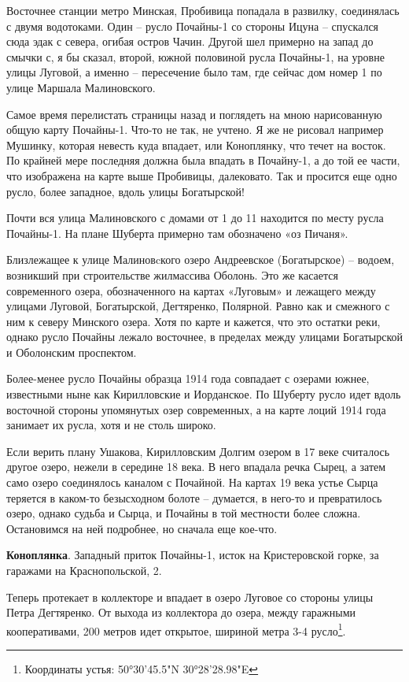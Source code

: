 Восточнее станции метро Минская, Пробивица попадала в развилку, соединялась с двумя водотоками. Один – русло Почайны-1 со стороны Ицуна – спускался сюда эдак с севера, огибая остров Чачин. Другой шел примерно на запад до смычки с, я бы сказал, второй, южной половиной русла Почайны-1, на уровне улицы Луговой, а именно – пересечение было там, где сейчас дом номер 1 по улице Маршала Малиновского.

Самое время перелистать страницы назад и поглядеть на мною нарисованную общую карту Почайны-1. Что-то не так, не учтено. Я же не рисовал например Мушинку, которая невесть куда впадает, или Коноплянку, что течет на восток. По крайней мере последняя должна была впадать в Почайну-1, а до той ее части, что изображена на карте выше Пробивицы, далековато. Так и просится еще одно русло, более западное, вдоль улицы Богатырской!

Почти вся улица Малиновского с домами от 1 до 11 находится по месту русла Почайны-1. На плане Шуберта примерно там обозначено «оз Пичаня».

Близлежащее к улице Малиновcкого озеро Андреевское (Богатырское) – водоем, возникший при строительстве жилмассива Оболонь. Это же касается современного озера, обозначенного на картах «Луговым» и лежащего между улицами Луговой, Богатырской, Дегтяренко, Полярной. Равно как и смежного с ним к северу Минского озера. Хотя по карте и кажется, что это остатки реки, однако русло Почайны лежало восточнее, в пределах между улицами Богатырской и Оболонским проспектом.

Более-менее русло Почайны образца 1914 года совпадает с озерами южнее, известными ныне как Кирилловские и Иорданское. По Шуберту русло идет вдоль восточной стороны упомянутых озер современных, а на карте лоций 1914 года занимает их русла, хотя и не столь широко.

Если верить плану Ушакова, Кирилловским Долгим озером в 17 веке считалось другое озеро, нежели в середине 18 века. В него впадала речка Сырец, а затем само озеро соединялось каналом с Почайной. На картах 19 века устье Сырца теряется в каком-то безысходном болоте – думается, в него-то и превратилось озеро, однако судьба и Сырца, и Почайны в той местности более сложна. Остановимся на ней подробнее, но сначала еще кое-что.

\textbf{Коноплянка}. Западный приток Почайны-1, исток на Кристеровской горке, за гаражами на Краснопольской, 2. 

Теперь протекает в коллекторе и впадает в озеро Луговое со стороны улицы Петра Дегтяренко. От выхода из коллектора до озера, между гаражными кооперативами, 200 метров идет открытое, шириной метра 3-4 русло\footnote{Координаты устья: 50°30'45.5"N 30°28'28.98"E}. 

